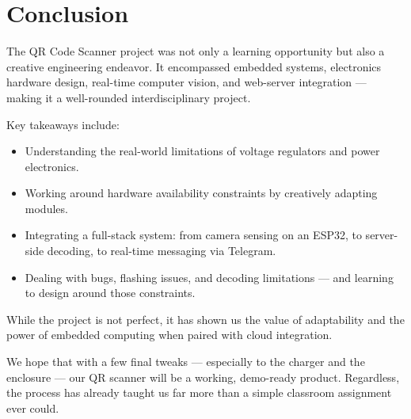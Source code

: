 \chapter{Conclusion}

The QR Code Scanner project was not only a learning opportunity but also a creative engineering endeavor. It encompassed embedded systems, electronics hardware design, real-time computer vision, and web-server integration — making it a well-rounded interdisciplinary project.

Key takeaways include:

\begin{itemize}
    \item Understanding the real-world limitations of voltage regulators and power electronics.
    \item Working around hardware availability constraints by creatively adapting modules.
    \item Integrating a full-stack system: from camera sensing on an ESP32, to server-side decoding, to real-time messaging via Telegram.
    \item Dealing with bugs, flashing issues, and decoding limitations — and learning to design around those constraints.
\end{itemize}

While the project is not perfect, it has shown us the value of adaptability and the power of embedded computing when paired with cloud integration.

We hope that with a few final tweaks — especially to the charger and the enclosure — our QR scanner will be a working, demo-ready product. Regardless, the process has already taught us far more than a simple classroom assignment ever could.

